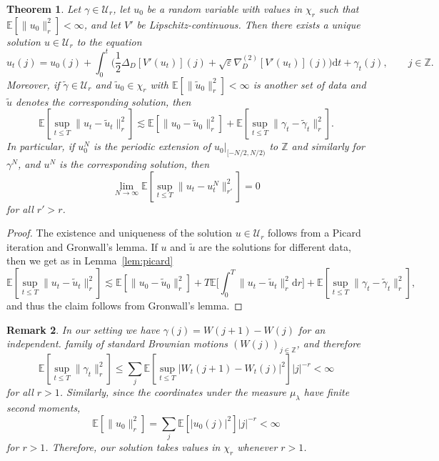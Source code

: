 \documentclass[11pt, a4paper]{article}
\newcommand{\mathd}{\mathrm{d}}
\newtheorem{theorem}{Theorem}[section]
\newtheorem{remark}[theorem]{Remark}
\newcommand{\1}{\mathbf{1}}
\begin{document}
\begin{theorem}\label{thm:periodic approximation}
   Let $\gamma \in \mathcal{U}_r$, let
  $u_0$ be a random variable with values in $\chi_r$ such that $\mathbb{E}
  [\| u_0 \|_r^2] < \infty$, and let $V'$ be Lipschitz-continuous. Then there exists a unique solution $u
  \in \mathcal{U}_{r}$ to the equation
  \[ u_t (j) = u_0 (j) + \int_0^t \Big( \frac{1}{2} \Delta_D [V' (u_t)] (j) +
     \sqrt{\varepsilon} \nabla^{(2)}_D [V' (u_t)] (j) \Big) \mathd t +
     \gamma_t (j), \hspace{2em} j \in \mathbb{Z}. \]
  Moreover, if $\tilde{\gamma} \in \mathcal{U}_r$ and $\tilde{u}_0 \in \chi_r$
  with $\mathbb{E} [\| \tilde{u}_0 \|_r^2] < \infty$ is another set of data
  and $\tilde{u}$ denotes the corresponding solution, then
  \[ \mathbb{E} [\sup_{t \leqslant T} \| u_t - \tilde{u}_t \|_r^2] \lesssim
     \mathbb{E} [\| u_0 - \tilde{u}_0 \|_r^2] +\mathbb{E} [\sup_{t \leqslant
     T} \| \gamma_t - \tilde{\gamma}_t \|_r^2] . \]
  In particular, if $u_0^N$ is the periodic extension of $u_0 |_{[- N / 2, N /
  2)}$ to $\mathbb{Z}$ and similarly for $\gamma^N$, and $u^N$ is the
  corresponding solution, then
  \[ \lim_{N \rightarrow \infty} \mathbb{E} [\sup_{t \leqslant T} \| u_t -
     u^N_t \|_{r'}^2] = 0 \]
  for all $r' > r$.
\end{theorem}

\begin{proof}
  The existence and uniqueness of the solution $u \in \mathcal{U}_r$ follows
  from a Picard iteration and Gronwall's lemma. If $u$ and $\tilde{u}$ are the
  solutions for different data, then we get as in Lemma~\ref{lem:picard}
  \[ \mathbb{E} [\sup_{t \leqslant T} \| u_t - \tilde{u}_t \|_r^2] \lesssim
     \mathbb{E} [\| u_0 - \tilde{u}_0 \|_r^2] + T\mathbb{E} \Big[ \int_0^T
     \| u_t - \tilde{u}_t \|_r^2 \mathd r \Big] +\mathbb{E} [\sup_{t
     \leqslant T} \| \gamma_t - \tilde{\gamma}_t \|_r^2], \]
  and thus the claim follows from Gronwall's lemma.
\end{proof}

\begin{remark}
  In our setting we have $\gamma (j) = W (j + 1) - W (j)$ for an independent. family
  of standard Brownian motions $(W (j))_{j \in \mathbb{Z}}$, and therefore
  \[ \mathbb{E} [\sup_{t \leqslant T} \| \gamma_t \|_r^2] \leqslant \sum_j
     \mathbb{E} [\sup_{t \leqslant T} | W_t (j + 1) - W_t (j) |^2] | j |^{-
     r} < \infty \]
  for all $r > 1$. Similarly, since the coordinates under the measure ${\mu}_{\lambda}$ have
  finite second moments,
  \[ \mathbb{E} [\| u_0 \|_r^2] = \sum_j \mathbb{E} [| u_0 (j) |^2] | j |^{-
     r} < \infty \]
  for $r > 1$. Therefore, our solution takes values in $\chi_r$ whenever $r > 1$.
\end{remark}
\end{document}
